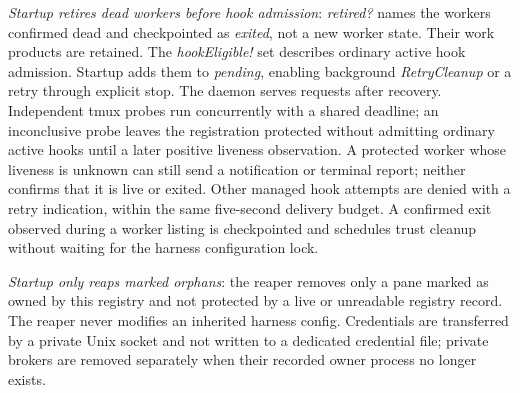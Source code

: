 \documentclass[a4paper,10pt,fleqn]{article}
\begin{document}
\emph{Startup retires dead workers before hook admission}:
\textit{retired?} names the workers confirmed dead and checkpointed as
\textit{exited}, not a new worker state. Their work products are retained.
The \textit{hookEligible!} set describes ordinary active hook admission.
Startup adds them to \textit{pending}, enabling background
\textit{RetryCleanup} or a retry through explicit stop. The daemon serves
requests after recovery. Independent tmux
probes run concurrently with a shared deadline; an inconclusive probe leaves
the registration protected without admitting ordinary active hooks until a
later positive liveness observation. A protected worker whose liveness is
unknown can still send a notification or terminal report; neither confirms
that it is live or exited. Other managed hook attempts are denied with a
retry indication, within the same five-second delivery budget.
A confirmed exit observed during a worker
listing is checkpointed and schedules trust cleanup without waiting for
the harness configuration lock.

\emph{Startup only reaps marked orphans}: the reaper removes only a pane
marked as owned by this registry and not protected by a live or unreadable
registry record. The reaper never modifies an inherited harness config.
Credentials are transferred by a private Unix socket and not written to
a dedicated credential file; private brokers are removed separately when
their recorded owner process no longer exists.
\end{document}
